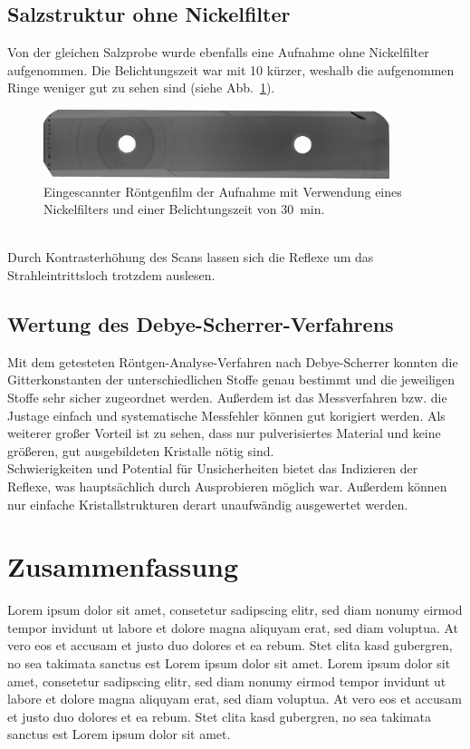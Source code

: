 \documentclass[a4paper,twoside,final]{article}
\begin{document}
\FloatBarrier
\subsection{Salzstruktur ohne Nickelfilter}
Von der gleichen Salzprobe wurde ebenfalls eine Aufnahme ohne Nickelfilter aufgenommen. Die Belichtungszeit war mit \SI{10}{\min} kürzer, weshalb die aufgenommen Ringe weniger gut zu sehen sind (siehe Abb.~\ref{fig:Film_ohneFilter}).
\begin{figure}[htp]
    \centering
        \includegraphics[width=0.9\textwidth]{Abbildungen/Roentgenfilm_ohne_Filter.jpg}
    \caption{Eingescannter Röntgenfilm der Aufnahme mit Verwendung eines Nickelfilters und einer Belichtungszeit von \SI{30}{\minute}.}
    \label{fig:Film_ohneFilter}
\end{figure}\\
Durch Kontrasterhöhung des Scans lassen sich die Reflexe um das Strahleintrittsloch trotzdem auslesen.



\subsection{Wertung des Debye-Scherrer-Verfahrens}
Mit dem getesteten Röntgen-Analyse-Verfahren nach Debye-Scherrer konnten die Gitterkonstanten der unterschiedlichen Stoffe genau bestimmt und die jeweiligen Stoffe sehr sicher zugeordnet werden. Außerdem ist das Messverfahren bzw. die Justage einfach und systematische Messfehler können gut korigiert werden. Als weiterer großer Vorteil ist zu sehen, dass nur pulverisiertes Material und keine größeren, gut ausgebildeten Kristalle nötig sind.\\
Schwierigkeiten und Potential für Unsicherheiten bietet das Indizieren der Reflexe, was hauptsächlich durch Ausprobieren möglich war. Außerdem können nur einfache Kristallstrukturen derart unaufwändig ausgewertet werden. 

\section{Zusammenfassung}
Lorem ipsum dolor sit amet, consetetur sadipscing elitr, sed diam nonumy eirmod tempor invidunt ut labore et dolore magna aliquyam erat, sed diam voluptua. At vero eos et accusam et justo duo dolores et ea rebum. Stet clita kasd gubergren, no sea takimata sanctus est Lorem ipsum dolor sit amet. Lorem ipsum dolor sit amet, consetetur sadipscing elitr, sed diam nonumy eirmod tempor invidunt ut labore et dolore magna aliquyam erat, sed diam voluptua. At vero eos et accusam et justo duo dolores et ea rebum. Stet clita kasd gubergren, no sea takimata sanctus est Lorem ipsum dolor sit amet.
\end{document}
